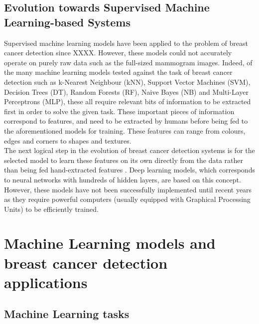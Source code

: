 \subsection{Evolution towards Supervised Machine Learning-based Systems}

Supervised machine learning models have been applied to the problem of breast cancer detection since XXXX. However, these models could not accurately operate on purely raw data such as the full-sized mammogram images. Indeed, of the many machine learning models tested against the task of breast cancer detection such as k-Nearest Neighbour (kNN), Support Vector Machines (SVM), Decision Trees (DT), Random Forests (RF), Naive Bayes (NB) and Multi-Layer Perceptrons (MLP), these all require relevant bits of information to be extracted first in order to solve the given task. These important pieces of information correspond to features, and need to be extracted by humans before being fed to the aforementioned models for training. These features can range from colours, edges and corners to shapes and textures.\\

The next logical step in the evolution of breast cancer detection systems is for the selected model to learn these features on its own directly from the data rather than being fed hand-extracted features \cite{Yala2019}. Deep learning models, which corresponds to neural networks with hundreds of hidden layers, are based on this concept. However, these models have not been successfully implemented until recent years as they require powerful computers (usually equipped with Graphical Processing Units) to be efficiently trained. 



\section{Machine Learning models and breast cancer detection applications}

\subsection{Machine Learning tasks}


